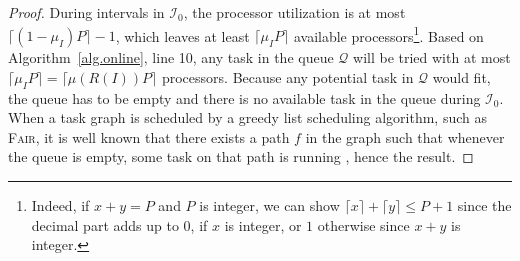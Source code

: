 \documentclass{article}
\newcommand\fair{\textsc{Fair}\xspace}
\newcommand\ratio{R\xspace}
\begin{document}
\begin{proof}
During intervals in $\mathcal{I}_0$, the processor utilization is at most $\lceil (1-\mu_I) P \rceil - 1$, which leaves at least $\lceil \mu_I P \rceil$ available processors\footnote{Indeed, if $x+y=P$ and $P$ is integer, we can show $\lceil x \rceil+ \lceil y \rceil \leq P+1$ since the decimal part adds up to $0$, if $x$ is integer, or $1$ otherwise since $x+y$ is integer.}. Based on Algorithm~\ref{alg.online}, line 10, any task in the queue $\mathcal{Q}$ will be tried with at most $\lceil \mu_I P \rceil=\lceil \mu(\ratio(I)) P \rceil$ processors. Because any potential task in $\mathcal{Q}$ would fit, the queue has to be empty and there is no available task in the queue  during $\mathcal{I}_0$. When a task graph is scheduled by a greedy list scheduling algorithm, such as \fair, it is well known that there exists a path $f$ in the graph such that whenever the queue is empty, some task on that path is running \cite{Feldmann98_DAG, Lepere01_DAG, Jansen06_DAG}, hence the result.
\end{proof}
\end{document}
